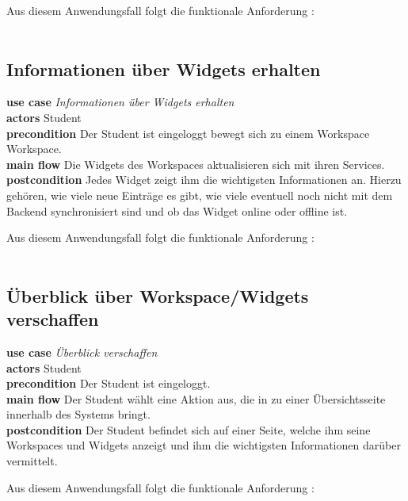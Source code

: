 Aus diesem Anwendungsfall folgt die funktionale Anforderung :\\
\requirement{\requirementWidgetSortDragNDrop}\label{requirementWidgetSortDragNDrop}\\

\subsection{Informationen über Widgets erhalten}
\textbf{use case} \emph{Informationen über Widgets erhalten}\\
\textbf{actors} Student\\
\textbf{precondition} Der Student ist eingeloggt bewegt sich zu einem Workspace Workspace.\\
\textbf{main flow} Die Widgets des Workspaces aktualisieren sich mit ihren Services. \\
\textbf{postcondition} Jedes Widget zeigt ihm die wichtigsten Informationen an. Hierzu gehören, wie viele neue Einträge es gibt, wie viele eventuell noch nicht mit dem Backend synchronisiert sind und ob das Widget online oder offline ist.
 
Aus diesem Anwendungsfall folgt die funktionale Anforderung :\\
\requirement{\requirementWidgetInformSystem}\label{requirementWidgetInformSystem}\\

\subsection{Überblick über Workspace/Widgets verschaffen}
\textbf{use case} \emph{Überblick verschaffen}\\
\textbf{actors} Student\\
\textbf{precondition} Der Student ist eingeloggt.\\
\textbf{main flow} Der Student wählt eine Aktion aus, die in zu einer Übersichtsseite innerhalb des Systems bringt.\\
\textbf{postcondition} Der Student befindet sich auf einer Seite, welche ihm seine Workspaces und Widgets anzeigt und ihm die wichtigsten Informationen darüber vermittelt.

Aus diesem Anwendungsfall folgt die funktionale Anforderung :\\
\requirement{\requirementDashboard}\label{requirementDashboard}\\

